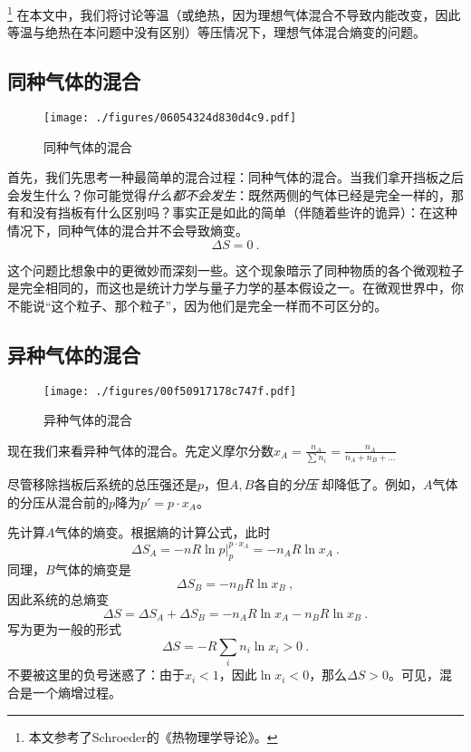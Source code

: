 

\footnote{本文参考了Schroeder的《热物理学导论》。} 在本文中，我们将讨论等温（或绝热，因为理想气体混合不导致内能改变，因此等温与绝热在本问题中没有区别）等压情况下，理想气体混合熵变的问题。

\subsection{同种气体的混合}
\begin{figure}[ht]
\centering
\texttt{[image: ./figures/06054324d830d4c9.pdf]}
\caption{同种气体的混合} \label{fig_IGME_1}
\end{figure}
首先，我们先思考一种最简单的混合过程：同种气体的混合。当我们拿开挡板之后会发生什么？你可能觉得\textsl{什么都不会发生}：既然两侧的气体已经是完全一样的，那有和没有挡板有什么区别吗？事实正是如此的简单（伴随着些许的诡异）：在这种情况下，同种气体的混合并不会导致熵变。
\begin{equation}
\Delta S = 0~.
\end{equation}


这个问题比想象中的更微妙而深刻一些。这个现象暗示了同种物质的各个微观粒子是完全相同的，而这也是统计力学与量子力学的基本假设之一。在微观世界中，你不能说“这个粒子、那个粒子”，因为他们是完全一样而不可区分的。

\subsection{异种气体的混合}
\begin{figure}[ht]
\centering
\texttt{[image: ./figures/00f50917178c747f.pdf]}
\caption{异种气体的混合} \label{fig_IGME_fig2}
\end{figure}

现在我们来看异种气体的混合。先定义摩尔分数$x_A = \frac{n_A}{\sum n_i} = \frac{n_A}{n_A+n_B+...}$

尽管移除挡板后系统的总压强还是$p$，但$A, B$各自的\textsl{分压} 却降低了。例如，$A$气体的分压从混合前的$p$降为$p'=p \cdot x_A$。

先计算$A$气体的熵变。根据熵的计算公式，此时
$$
\Delta S_A=-nR\ln p |^{p \cdot x_A}_p=-n_A R \ln x_A~.
$$
同理，$B$气体的熵变是
$$
\Delta S_B=-n_B R \ln x_B~,
$$
因此系统的总熵变
$$
\Delta S = \Delta S_A+\Delta S_B= -n_A R \ln x_A - n_B R \ln x_B~.
$$
写为更为一般的形式
\begin{equation}
\Delta S = -R \sum_i n_i \ln x_i >0~.
\end{equation}
不要被这里的负号迷惑了：由于$x_i<1$，因此$\ln x_i < 0$，那么$\Delta S>0$。可见，混合是一个熵增过程。

